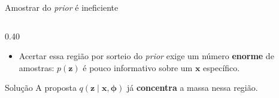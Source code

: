 \documentclass[aspectratio=169,xcolor=dvipsnames]{beamer}
\begin{document}
\begin{frame}{Amostrar do \textit{prior} é ineficiente}
\begin{columns}[c]
\begin{column}{0.40\textwidth}
\begin{itemize}
          \item Acertar essa região por sorteio do \textit{prior} exige
          um número \textbf{enorme} de amostras: $p(\mathbf{z})$ é pouco
          informativo sobre um $\mathbf{x}$ específico.
        \end{itemize}
        \vspace{0.3em}
        \begin{block}{Solução}
          A proposta \textcolor{EncRed}{$q(\mathbf{z}\mid \mathbf{x},\bm{\phi})$} já
          \textbf{concentra} a massa nessa região.
        \end{block}
      \end{column}
    \end{columns}
  \end{frame}

\end{document}

